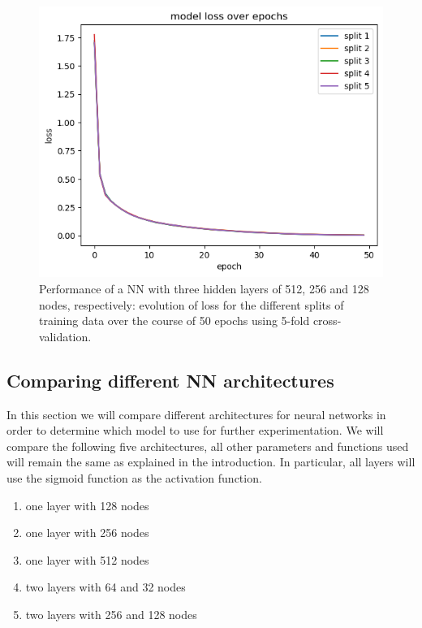 \documentclass[12pt]{article}
\begin{document}
\begin{figure}[ht]
    \centering
   \includegraphics[scale=0.6]{graphics/loss_over_epochs_exercise_a.png}
    \caption{Performance of a NN with three hidden layers of 512, 256 and 128 nodes, respectively: evolution of loss for the different splits of training data over the course of 50 epochs using 5-fold cross-validation.}
    \label{fig:exercisea}
\end{figure}



\subsection{Comparing different NN architectures}\label{sec:comparison}
In this section we will compare different architectures for neural networks in order to determine which model to use for further experimentation. We will compare the following five architectures, all other parameters and functions used will remain the same as explained in the introduction. In particular, all layers will use the sigmoid function as the activation function. 

\begin{enumerate}
    \item one layer with 128 nodes
    \item one layer with 256 nodes
    \item one layer with 512 nodes
    \item two layers with 64 and 32 nodes 
    \item two layers with 256 and 128 nodes
\end{enumerate}
\end{document}
